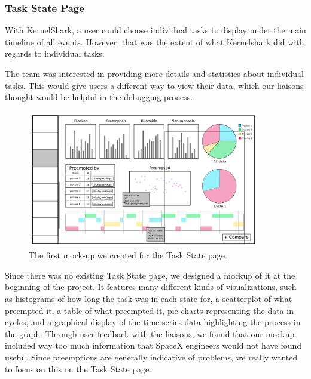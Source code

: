 \documentclass{hmcclinic}
\begin{document}
\subsubsection{Task State Page}

With KernelShark, a user could choose individual tasks to display under
the main timeline of all events. However, that was the extent of what
Kernelshark did with regards to individual tasks.

The team was interested in providing more details and statistics about
individual tasks. This would give users a different way to view
their data, which our liaisons thought would be helpful
in the debugging process.

\begin{figure}[H]
\begin{center}
\includegraphics[width=4in]{perProcess-49.png}
\caption{The first mock-up we created for the Task State page.}
\end{center}
\end{figure}

Since there was no existing Task State page, we designed a mockup of it at the
beginning of the project. It features many different kinds of visualizations,
such as histograms of how long the task was in each state for, a scatterplot of 
what preempted it, a table of what preempted it, pie charts representing the 
data in cycles, and a graphical display of the time series data highlighting 
the process in the graph. Through user feedback with the liaisons, we found 
that our mockup included way too much information that SpaceX engineers would 
not have found useful. Since preemptions are generally
indicative of problems, we really wanted to focus on this on the Task State
page.
\end{document}
